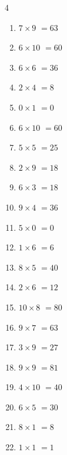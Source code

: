 \begin{multicols}{4}
\begin{enumerate}
  \item $7\times 9$
        $=63$

  \item $6\times 10$
        $=60$

  \item $6\times 6$
        $=36$

  \item $2\times 4$
        $=8$

  \item $0\times 1$
        $=0$

  \item $6\times 10$
        $=60$

  \item $5\times 5$
        $=25$

  \item $2\times 9$
        $=18$

  \item $6\times 3$
        $=18$

  \item $9\times 4$
        $=36$

  \item $5\times 0$
        $=0$

  \item $1\times 6$
        $=6$

  \item $8\times 5$
        $=40$

\columnbreak %

\resetques

  \item $2\times 6$
        $=12$

  \item $10\times 8$
        $=80$

  \item $9\times 7$
        $=63$

  \item $3\times 9$
        $=27$

  \item $9\times 9$
        $=81$

  \item $4\times 10$
        $=40$

  \item $6\times 5$
        $=30$

  \item $8\times 1$
        $=8$

  \item $1\times 1$
        $=1$


\end{enumerate}
\end{multicols}
